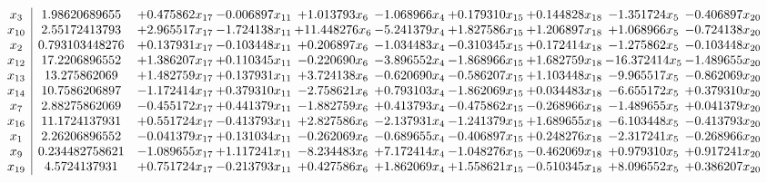 \documentclass[10pt]{article}
\begin{document}
 \[\begin{array}{c| c c@{\hskip 2pt} c@{\hskip 2pt} c@{\hskip 2pt} c@{\hskip 2pt} c@{\hskip 2pt} c@{\hskip 2pt} c@{\hskip 2pt} c@{\hskip 2pt} }
 x_{3}   &  1.98620689655 & + 0.475862 x_{17} & -0.006897 x_{11} & + 1.013793 x_{6} & -1.068966 x_{4} & + 0.179310 x_{15} & + 0.144828 x_{18} & -1.351724 x_{5} & -0.406897 x_{20}\\
 x_{10}   &  2.55172413793 & + 2.965517 x_{17} & -1.724138 x_{11} & + 11.448276 x_{6} & -5.241379 x_{4} & + 1.827586 x_{15} & + 1.206897 x_{18} & + 1.068966 x_{5} & -0.724138 x_{20}\\
 x_{2}   &  0.793103448276 & + 0.137931 x_{17} & -0.103448 x_{11} & + 0.206897 x_{6} & -1.034483 x_{4} & -0.310345 x_{15} & + 0.172414 x_{18} & -1.275862 x_{5} & -0.103448 x_{20}\\
 x_{12}   &  17.2206896552 & + 1.386207 x_{17} & + 0.110345 x_{11} & -0.220690 x_{6} & -3.896552 x_{4} & -1.868966 x_{15} & + 1.682759 x_{18} & -16.372414 x_{5} & -1.489655 x_{20}\\
 x_{13}   &  13.275862069 & + 1.482759 x_{17} & + 0.137931 x_{11} & + 3.724138 x_{6} & -0.620690 x_{4} & -0.586207 x_{15} & + 1.103448 x_{18} & -9.965517 x_{5} & -0.862069 x_{20}\\
 x_{14}   &  10.7586206897 & -1.172414 x_{17} & + 0.379310 x_{11} & -2.758621 x_{6} & + 0.793103 x_{4} & -1.862069 x_{15} & + 0.034483 x_{18} & -6.655172 x_{5} & + 0.379310 x_{20}\\
 x_{7}   &  2.88275862069 & -0.455172 x_{17} & + 0.441379 x_{11} & -1.882759 x_{6} & + 0.413793 x_{4} & -0.475862 x_{15} & -0.268966 x_{18} & -1.489655 x_{5} & + 0.041379 x_{20}\\
 x_{16}   &  11.1724137931 & + 0.551724 x_{17} & -0.413793 x_{11} & + 2.827586 x_{6} & -2.137931 x_{4} & -1.241379 x_{15} & + 1.689655 x_{18} & -6.103448 x_{5} & -0.413793 x_{20}\\
 x_{1}   &  2.26206896552 & -0.041379 x_{17} & + 0.131034 x_{11} & -0.262069 x_{6} & -0.689655 x_{4} & -0.406897 x_{15} & + 0.248276 x_{18} & -2.317241 x_{5} & -0.268966 x_{20}\\
 x_{9}   &  0.234482758621 & -1.089655 x_{17} & + 1.117241 x_{11} & -8.234483 x_{6} & + 7.172414 x_{4} & -1.048276 x_{15} & -0.462069 x_{18} & + 0.979310 x_{5} & + 0.917241 x_{20}\\
 x_{19}   &  4.5724137931 & + 0.751724 x_{17} & -0.213793 x_{11} & + 0.427586 x_{6} & + 1.862069 x_{4} & + 1.558621 x_{15} & -0.510345 x_{18} & + 8.096552 x_{5} & + 0.386207 x_{20}\\

\end{array}\]
\end{document}
